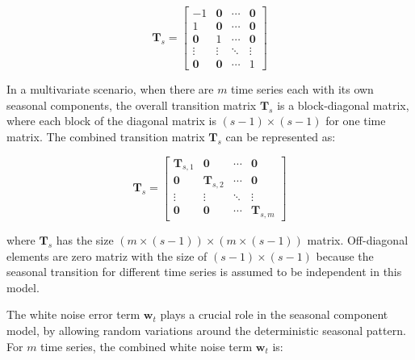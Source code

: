     \begin{equation}
        \mathbf{T}_s=
            \left[
                \begin{array}{cccc}
                    -1             & \mathbf{0} & \cdots & \mathbf{0} \\
                    1              & \mathbf{0} & \cdots & \mathbf{0} \\
                    \mathbf{0}     & 1          & \cdots & \mathbf{0} \\
                    \vdots         & \vdots     & \ddots & \vdots     \\
                    \mathbf{0}     & \mathbf{0} & \cdots & 1
                \end{array}
            \right]
    \label{eq:seasonal_transition_uni}
    \end{equation}

    In a multivariate scenario, when there are $m$ time series each with its own seasonal components,
    the overall transition matrix $\mathbf{T}_s$ is a block-diagonal matrix, where each block of the diagonal matrix
    is $(s-1) \times (s-1)$ for one time matrix.
    The combined transition matrix $\mathbf{T}_{s}$ can be represented as:

    \begin{equation}
        \mathbf{T}_s=
            \left[
                \begin{array}{cccc}
                    \mathbf{T}_{s, 1} & \mathbf{0}        & \cdots & \mathbf{0} \\
                    \mathbf{0}        & \mathbf{T}_{s, 2} & \cdots & \mathbf{0} \\
                    \vdots            & \vdots            & \ddots & \vdots     \\
                    \mathbf{0}        & \mathbf{0}        & \cdots & \mathbf{T}_{s, m}
                \end{array}
            \right]
    \label{eq:seasonal_transition_mv}
    \end{equation}

    where $\mathbf{T}_{s}$ has the size $(m \times (s-1)) \times (m \times (s-1))$ matrix.
    Off-diagonal elements are zero matriz with the size of $(s-1) \times (s-1)$ because
    the seasonal transition for different time series is assumed to be independent in this model.

    The white noise error term $\bm{w}_{t}$ plays a crucial role in the seasonal component model,
    by allowing random variations around the deterministic seasonal pattern.
    For $m$ time series, the combined white noise term $\bm{w}_{t}$ is:

